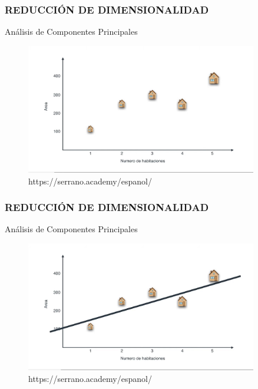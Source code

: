 \documentclass{beamer}
\begin{document}
\begin{frame}
	\frametitle{REDUCCIÓN DE DIMENSIONALIDAD}
	\begin{block}{Análisis de Componentes Principales}	
		\begin{figure}
			\includegraphics[width=0.9\textwidth]{PCA/IMG_3537.jpg}
			\caption{https://serrano.academy/espanol/}
		\end{figure}
	\end{block}
\end{frame}

\begin{frame}
	\frametitle{REDUCCIÓN DE DIMENSIONALIDAD}
	\begin{block}{Análisis de Componentes Principales}	
		\begin{figure}
			\includegraphics[width=0.9\textwidth]{PCA/IMG_3538.jpg}
			\caption{https://serrano.academy/espanol/}
		\end{figure}
	\end{block}
\end{frame}
\end{document}
